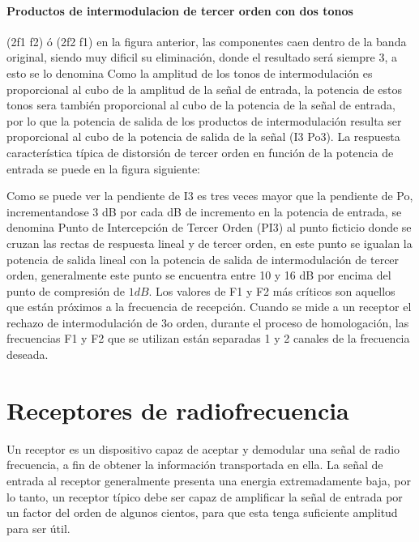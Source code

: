 \documentclass[a4paper,10pt,spanish]{report}
\let\sphinxpxdimen\pdfpxdimen\else\newdimen\sphinxpxdimen
\begin{document}
\subsubsection{Productos de intermodulacion de tercer orden con dos tonos}
\label{\detokenize{introduccion/sistemas:Productos-de-intermodulacion-de-tercer-orden-con-dos-tonos}}
(2f1 \textendash{} f2) ó (2f2 \textendash{} f1) en la figura anterior, las componentes caen dentro de la banda original, siendo muy dificil su eliminación, donde el resultado será siempre 3, a esto se lo denomina Como la amplitud de los tonos de intermodulación es proporcional al cubo de la amplitud de la señal de entrada, la potencia de estos tonos sera también proporcional al cubo de la potencia de la señal de entrada, por lo que la potencia de salida de los productos de intermodulación resulta ser proporcional al
cubo de la potencia de salida de la señal (I3 Po3). La respuesta característica típica de distorsión de tercer orden en función de la potencia de entrada se puede en la figura siguiente:

\sphinxincludegraphics[width=1067\sphinxpxdimen,height=567\sphinxpxdimen]{{linealidad2}.png}

Como se puede ver la pendiente de I3 es tres veces mayor que la pendiente de Po, incrementandose 3 dB por cada dB de incremento en la potencia de entrada, se denomina Punto de Intercepción de Tercer Orden (PI3) al punto ficticio donde se cruzan las rectas de respuesta lineal y de tercer orden, en este punto se igualan la potencia de salida lineal con la potencia de salida de intermodulación de tercer orden, generalmente este punto se encuentra entre 10 y 16 dB por encima del punto de compresión
de \(1 dB\). Los valores de F1 y F2 más críticos son aquellos que están próximos a la frecuencia de recepción. Cuando se mide a un receptor el rechazo de intermodulación de 3o orden, durante el proceso de homologación, las frecuencias F1 y F2 que se utilizan están separadas 1 y 2 canales de la frecuencia deseada.


\chapter{Receptores de radiofrecuencia}
\label{\detokenize{introduccion/sistemas:Receptores-de-radiofrecuencia}}
Un receptor es un dispositivo capaz de aceptar y demodular una señal de radio frecuencia, a fin de obtener la información transportada en ella. La señal de entrada al receptor generalmente presenta una energia extremadamente baja, por lo tanto, un receptor típico debe ser capaz de amplificar la señal de entrada por un factor del orden de algunos cientos, para que esta tenga suficiente amplitud para ser útil.
\end{document}
